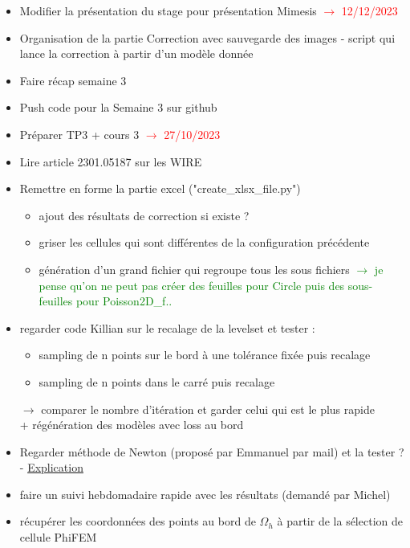 \documentclass{article}
\newcommand{\done}{\rlap{$\square$}{\raisebox{2pt}{\large\hspace{1pt}\ding{51}}}%
	\hspace{-2.5pt}}
\newcommand{\sdone}{\rlap{\LARGE $\circ$}{\raisebox{2pt}{\hspace{1pt}\ding{51}}}}
\newcommand{\swontfix}{\rlap{\LARGE $\circ$}{\hspace{1pt}\ding{55}}}
\begin{document}
	\begin{itemize}[label=$\square$]
		\item Modifier la présentation du stage pour présentation Mimesis \textcolor{red}{$\rightarrow$ 12/12/2023}
		\item[\done] Organisation de la partie Correction avec sauvegarde des images - script qui lance la correction à partir d'un modèle donnée
		\item[\done] Faire récap semaine 3
		\item[\done] Push code pour la Semaine 3 sur github
		\item[\done] Préparer TP3 + cours 3 \textcolor{red}{$\rightarrow$ 27/10/2023}
		\item Lire article 2301.05187 sur les WIRE
		\item[\done] Remettre en forme la partie excel ("create\_xlsx\_file.py")
		\begin{itemize}[label=\LARGE $\circ$]
			\item[\sdone] ajout des résultats de correction si existe ?
			\item[\sdone] griser les cellules qui sont différentes de la configuration précédente
			\item[\swontfix] génération d'un grand fichier qui regroupe tous les sous fichiers \textcolor{Green}{$\rightarrow$ je pense qu'on ne peut pas créer des feuilles pour Circle puis des sous-feuilles pour Poisson2D\_f..}		
		\end{itemize}
		\item regarder code Killian sur le recalage de la levelset et tester :
		\begin{itemize}[label=\LARGE $\circ$]
			\item sampling de n points sur le bord à une tolérance fixée puis recalage
			\item sampling de n points dans le carré puis recalage
		\end{itemize}
		$\rightarrow$ comparer le nombre d'itération et garder celui qui est le plus rapide \\
		+ régénération des modèles avec loss au bord
		\item Regarder méthode de Newton (proposé par Emmanuel par mail) et la tester ? - \href{https://www.mathweb.fr/euclide/methode-de-newton/}{Explication}
		\item faire un suivi hebdomadaire rapide avec les résultats (demandé par Michel)
		\item récupérer les coordonnées des points au bord de $\Omega_h$ à partir de la sélection de cellule PhiFEM

\end{itemize}
\end{document}
